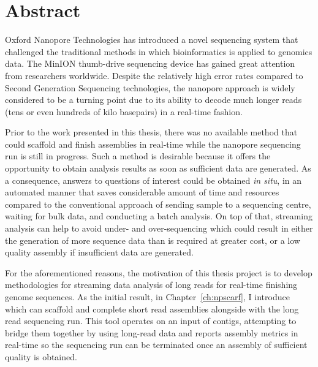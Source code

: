 \chapter*{Abstract}

Oxford Nanopore Technologies has introduced a novel sequencing system that challenged the traditional methods in which bioinformatics is applied to genomics data. The MinION thumb-drive sequencing device has gained great attention from researchers worldwide. Despite the relatively high error rates compared to Second Generation Sequencing technologies, the nanopore approach is widely considered to be a turning point due to its ability to decode much longer reads (tens or even hundreds of kilo basepairs) in a real-time fashion.

Prior to the work presented in this thesis, there was no available method that could scaffold and finish assemblies in real-time while the nanopore sequencing run is still in progress. Such a method is desirable because it offers the opportunity to obtain analysis results as soon as sufficient data are generated.
As a consequence, answers to questions of interest could be obtained \emph{in situ}, in an automated manner that saves considerable amount of time and resources compared to the conventional approach of sending sample to a sequencing centre, waiting for bulk data, and conducting a batch analysis. 
On top of that, streaming analysis can help to avoid under- and over-sequencing which could result in either the generation of more sequence data than is required at greater cost, or a low quality assembly if insufficient data are generated.

For the aforementioned reasons, the motivation of this thesis project is to develop methodologies for streaming data analysis of long reads for real-time finishing genome sequences.
As the initial result, in Chapter~\ref{ch:npscarf}, I introduce \npscarf{} which can scaffold and complete short read assemblies alongside with the long read sequencing run. This tool operates on an input of contigs, attempting to bridge them together by using long-read data and reports assembly metrics in real-time so the sequencing run can be terminated once an assembly of sufficient quality is obtained.

